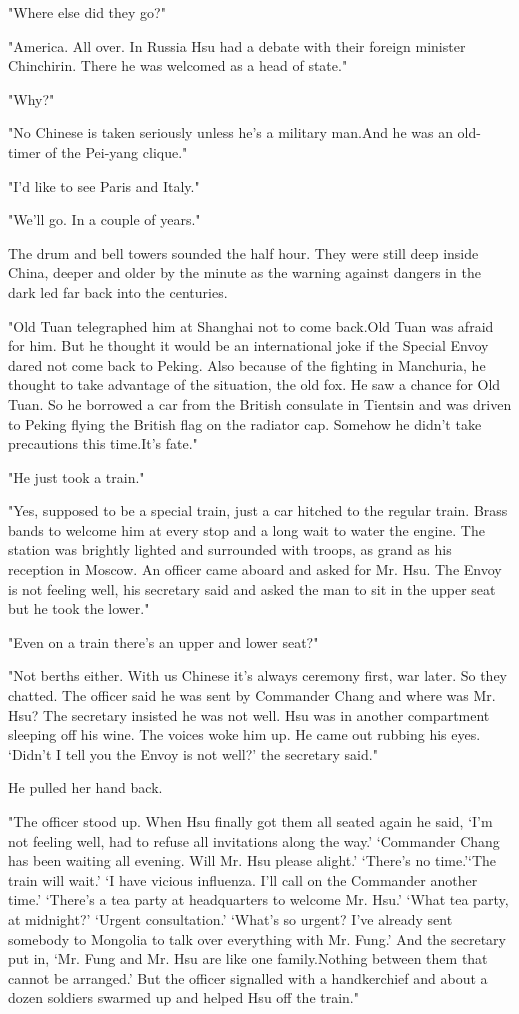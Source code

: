 \par "Where else did they go?"
\par "America. All over. In Russia Hsu had a debate with their foreign minister Chinchirin. There he was welcomed as a head of state."
\par "Why?"
\par "No Chinese is taken seriously unless he's a military man.And he was an old-timer of the Pei-yang clique."
\par "I'd like to see Paris and Italy."
\par "We'll go. In a couple of years."
\par The drum and bell towers sounded the half hour. They were still deep inside China, deeper and older by the minute as the warning against dangers in the dark led far back into the centuries.
\par "Old Tuan telegraphed him at Shanghai not to come back.Old Tuan was afraid for him. But he thought it would be an international joke if the Special Envoy dared not come back to Peking. Also because of the fighting in Manchuria, he thought to take advantage of the situation, the old fox. He saw a chance for Old Tuan. So he borrowed a car from the British consulate in Tientsin and was driven to Peking flying the British flag on the radiator cap. Somehow he didn't take precautions this time.It's fate."
\par "He just took a train."
\par "Yes, supposed to be a special train, just a car hitched to the regular train. Brass bands to welcome him at every stop and a long wait to water the engine. The station was brightly lighted and surrounded with troops, as grand as his reception in Moscow. An officer came aboard and asked for Mr. Hsu. The Envoy is not feeling well, his secretary said and asked the man to sit in the upper seat but he took the lower."
\par "Even on a train there's an upper and lower seat?"
\par "Not berths either. With us Chinese it's always ceremony first, war later. So they chatted. The officer said he was sent by Commander Chang and where was Mr. Hsu? The secretary insisted he was not well. Hsu was in another compartment sleeping off his wine. The voices woke him up. He came out rubbing his eyes. ‘Didn't I tell you the Envoy is not well?' the secretary said."
\par He pulled her hand back.
\par "The officer stood up. When Hsu finally got them all seated again he said, ‘I'm not feeling well, had to refuse all invitations along the way.' ‘Commander Chang has been waiting all evening. Will Mr. Hsu please alight.' ‘There's no time.'‘The train will wait.' ‘I have vicious influenza. I'll call on the Commander another time.' ‘There's a tea party at headquarters to welcome Mr. Hsu.' ‘What tea party, at midnight?' ‘Urgent consultation.' ‘What's so urgent? I've already sent somebody to Mongolia to talk over everything with Mr. Fung.' And the secretary put in, ‘Mr. Fung and Mr. Hsu are like one family.Nothing between them that cannot be arranged.' But the officer signalled with a handkerchief and about a dozen soldiers swarmed up and helped Hsu off the train."
